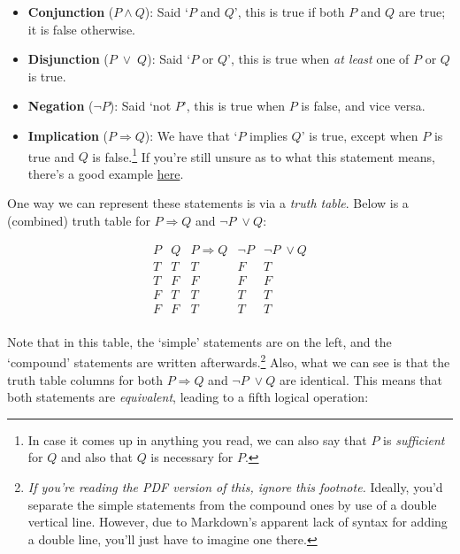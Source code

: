 \documentclass[
  10pt,
  a4paper]{article}
\providecommand{\tightlist}{%
  \setlength{\itemsep}{0pt}\setlength{\parskip}{0pt}}
\theoremstyle{plain}
\theoremstyle{definition}
\theoremstyle{plain}
\theoremstyle{plain}
\theoremstyle{plain}
\theoremstyle{plain}
\theoremstyle{definition}
\theoremstyle{definition}
\newtheorem*{Order Axioms*}{Order Axioms}\newtheorem{Order Axioms}{Order Axioms}[section]
\theoremstyle{remark}
\theoremstyle{remark}
\begin{document}
\begin{itemize}
\tightlist
\item
  \textbf{Conjunction} (\(P \wedge Q\)): Said `\(P\) and \(Q\)', this is true if both \(P\) and \(Q\) are true; it is false otherwise.
\item
  \textbf{Disjunction} (\(P \;\vee\; Q\)): Said `\(P\) or \(Q\)', this is true when \emph{at least} one of \(P\) or \(Q\) is true.
\item
  \textbf{Negation} (\(\neg P\)): Said `not \(P\)', this is true when \(P\) is false, and vice versa.
\item
  \textbf{Implication} (\(P\Rightarrow Q\)): We have that `\(P\) implies \(Q\)' is true, except when \(P\) is true and \(Q\) is false.\footnote{In case it comes up in anything you read, we can also say that \(P\) is \emph{sufficient} for \(Q\) and also that \(Q\) is necessary for \(P\).} If you're still unsure as to what this statement means, there's a good example \href{https://simple.wikipedia.org/wiki/Implication_(logic)}{here}.
\end{itemize}

One way we can represent these statements is via a \emph{truth table}. Below is a (combined) truth table for \(P \Rightarrow Q\) and \(\neg P \;\vee Q\):

\begin{equation*}
        \begin{array}{c|c||c|c|c}
            P & Q & P \Rightarrow Q & \neg P & \neg P \; \vee Q  \\
            \hline
            T & T & T & F & T \\
            T & F & F  & F & F \\
            F & T & T  & T & T \\
            F & F & T  & T & T \\
        \end{array}
\end{equation*}

Note that in this table, the `simple' statements are on the left, and the `compound' statements are written afterwards.\footnote{\emph{If you're reading the PDF version of this, ignore this footnote.} Ideally, you'd separate the simple statements from the compound ones by use of a double vertical line. However, due to Markdown's apparent lack of syntax for adding a double line, you'll just have to imagine one there.} Also, what we can see is that the truth table columns for both \(P \Rightarrow Q\) and \(\neg P \;\vee Q\) are identical. This means that both statements are \emph{equivalent}, leading to a fifth logical operation:
\end{document}
